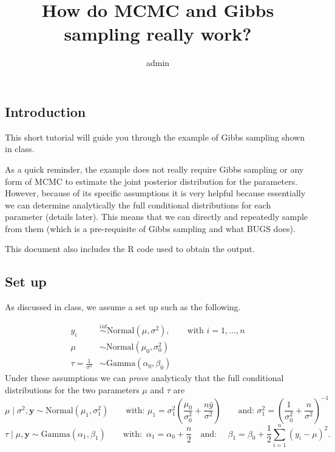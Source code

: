 \documentclass[
]{article}
\title{How do MCMC and Gibbs sampling really work?}
\author{admin}
\date{}
\begin{document}
\maketitle

\hypertarget{introduction}{%
\subsection{Introduction}\label{introduction}}

This short tutorial will guide you through the example of Gibbs sampling
shown in class.

As a quick reminder, the example does not really require Gibbs sampling
or any form of MCMC to estimate the joint posterior distribution for the
parameters. However, because of its specific assumptions it is very
helpful because essentially we can determine analytically the full
conditional distributions for each parameter (details later). This means
that we can directly and repeatedly sample from them (which is a
pre-requisite of Gibbs sampling and what BUGS does).

This document also includes the R code used to obtain the output.

\hypertarget{set-up}{%
\subsection{Set up}\label{set-up}}

As discussed in class, we assume a set up such as the following.

\begin{align}
y_i & \stackrel{iid}{\sim} \mbox{Normal}(\mu,\sigma^2),\qquad \mbox{with } i=1,\ldots,n \\
\mu & \sim \mbox{Normal}(\mu_0,\sigma^2_0) \\
\tau = \frac{1}{\sigma^2} & \sim \mbox{Gamma} (\alpha_0,\beta_0)
\end{align} Under these assumptions we can \emph{prove} analyticaly that
the full conditional distributions for the two parameters \(\mu\) and
\(\tau\) are
\[\mu\mid \sigma^2,\boldsymbol{y} \sim \mbox{Normal}(\mu_1,\sigma^2_1) \qquad \mbox{with: } \mu_1=\sigma^2_1\left( \frac{\mu_0}{\sigma^2_0} + \frac{n\bar{y}}{\sigma^2}\right) \qquad \mbox{and: } \sigma^2_1=\left(\frac{1}{\sigma^2_0}+\frac{n}{\sigma^2}\right)^{-1}\]
\[\tau\mid\mu,\boldsymbol{y} \sim \mbox{Gamma}(\alpha_1,\beta_1) \qquad \mbox{with: }\,\alpha_1=\alpha_0+\frac{n}{2}\quad \mbox{and: } \quad \beta_1 = \beta_0 + \frac{1}{2}\sum_{i=1}^n (y_i-\mu)^2.\]
\end{document}
